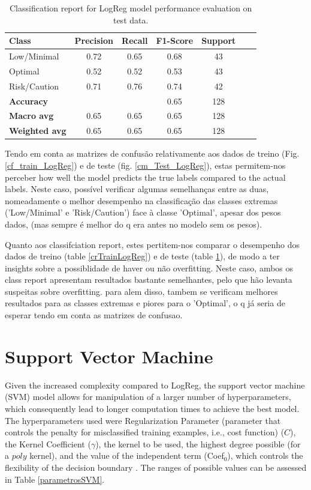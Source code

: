 \documentclass[conference]{IEEEtran}
\begin{document}
\begin{table}[H]
\centering
\caption{Classification report for LogReg model performance evaluation on test data.}
\label{crTestLogREg}
\begin{tabular}{lcccccc}
\toprule
\textbf{Class} & \textbf{Precision} & \textbf{Recall} & \textbf{F1-Score} & \textbf{Support} \\
\midrule
Low/Minimal & 0.72 & 0.65 & 0.68 & 43 \\
Optimal & 0.52 & 0.52 & 0.53 & 43 \\
Risk/Caution & 0.71 & 0.76 & 0.74 & 42 \\
\midrule
\textbf{Accuracy} &  &  & 0.65 & 128 \\
\textbf{Macro avg} & 0.65 & 0.65 & 0.65 & 128 \\
\textbf{Weighted avg} & 0.65 & 0.65 & 0.65 & 128 \\
\bottomrule
\end{tabular}
\end{table}

Tendo em conta as matrizes de confusão relativamente aos dados de treino (Fig. \ref{cf_train_LogReg}) e de teste (fig. \ref{cm_Test_LogReg}), estas permitem-nos perceber how well the model predicts the true labels compared to the actual labels. Neste caso, possível verificar algumas semelhanças entre as duas, nomeadamente o melhor desempenho na classificação das classes extremas ('Low/Minimal' e 'Risk/Caution') face à classe 'Optimal', apesar dos pesos dados, (mas sempre é melhor do q era antes no modelo sem os pesos).

Quanto aos classifciation report, estes pertitem-nos comparar o desempenho dos dados de treino (table \ref{crTrainLogReg}) e de teste (table \ref{crTestLogREg}), de modo a ter insights sobre a possiblidade de haver ou não overfitting. Neste caso, ambos os class report apresentam resultados bastante semelhantes, pelo que hão levanta suspeitas sobre overfitting. para alem disso, tambem se verificam melhores resultados para as classes extremas e piores para o 'Optimal', o q já seria de esperar tendo em conta as matrizes de confusao.


\section{Support Vector Machine}

Given the increased complexity compared to LogReg, the support vector machine (SVM) model allows for manipulation of a larger number of hyperparameters, which consequently lead to longer computation times to achieve the best model. The hyperparameters used were Regularization Parameter (parameter that controls the penalty for misclassified training examples, i.e., cost function) ($C$), the Kernel Coefficient ($\gamma$), the kernel to be used, the highest degree possible (for a $poly$ kernel), and the value of the independent term (Coef$_0$), which controls the flexibility of the decision boundary \cite{svm24}. The ranges of possible values can be assessed in Table \ref{parametrosSVM}.
\end{document}
